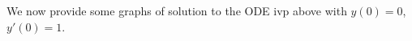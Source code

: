 \documentclass[12pt,reqno]{amsart}
\numberwithin{equation}{section}  %
\begin{document}
%
We now provide some graphs of solution to the ODE ivp above with $y(0) = 0$,
$y'(0) =1$. 

\begin{figure}[!h]
  \begin{center}
  \vspace{-30mm}
  \hspace{-15mm}
\subfloat{\texttt{[image: c3b1]}} 
\hspace{-40mm}
\subfloat{\texttt{[image: c3b3]}}
\\
\vspace{-70mm}
\hspace{-15mm}
\subfloat{\texttt{[image: c7b3]}}
\hspace{-40mm}
\subfloat{\texttt{[image: c13b3]}}
\end{center}
\end{figure}
\end{document}
